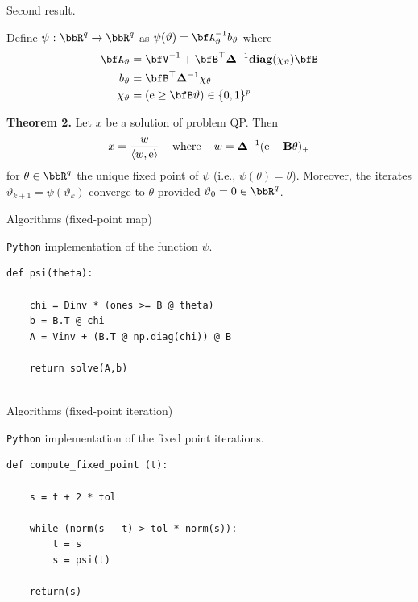 \documentclass[11pt,leqno]{beamer}
\begin{document}
\begin{frame}{Second result.}

Define $\psi \cst \bbR^q \to \bbR^q$ as 
$\psi (\vartheta) = \bfA^{-1}_\vartheta b_\vartheta$ where
\begin{equation}
\begin{aligned}
  \bfA_\vartheta &= \bfV^{-1} + \bfB^\top \bdel^{-1}
  \textbf{diag}(\chi_\vartheta) \bfB \\
  b_\vartheta &= \bfB^\top \bdel^{-1} \chi_\theta \\
  \chi_\vartheta &= (\rme \ge \bfB \vartheta)   
  \in \{0,1\}^p
\end{aligned}
\end{equation}


{\bf Theorem 2.} Let $x$ be a solution of 
problem QP. Then
\begin{align}
   x = \frac{w}{\langle w, \mathrm{e} \rangle}
  \hspace{0.16in}
  \text{where} 
  \hspace{0.16in} 
   w = \bm{\Delta}^{-1} (\mathrm{e} - \mathbf{B} \theta)_+
\end{align}
for $\theta \in \bbR^q$ the unique  fixed
point of $\psi$ (i.e., $\psi(\theta) = \theta$).
Moreover, the iterates $\vartheta_{k+1}
= \psi (\vartheta_k)$ converge to $\theta$
provided $\vartheta_0 = 0 \in \bbR^q$.


\end{frame}


\begin{frame}[fragile]{Algorithms (fixed-point map)}

\verb|Python| implementation of the function $\psi$.

\begin{verbatim}
def psi(theta):

    chi = Dinv * (ones >= B @ theta)
    b = B.T @ chi
    A = Vinv + (B.T @ np.diag(chi)) @ B
    
    return solve(A,b)


\end{verbatim}

\end{frame}




\begin{frame}[fragile]{Algorithms (fixed-point iteration)}

\verb|Python| implementation of the fixed point iterations.

\begin{verbatim}
def compute_fixed_point (t):

    s = t + 2 * tol

    while (norm(s - t) > tol * norm(s)):
        t = s
        s = psi(t)

    return(s)
\end{verbatim}

\end{frame}
\end{document}
